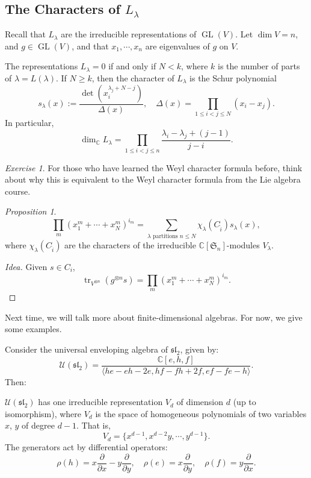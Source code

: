 \documentclass[a4paper]{report}
\theoremstyle{definition}
\theoremstyle{remark}
\theoremstyle{proposition}
\newtheorem{proposition}{Proposition}
\theoremstyle{conjecture}
\theoremstyle{lemma}
\theoremstyle{corollary}
\theoremstyle{exercise}
\newtheorem{exercise}{Exercise}
\theoremstyle{example}
\newcommand{\C}{\mathbb{C}}
\newcommand{\mcal}{\mathcal}
\newcommand{\on}{\operatorname}
\begin{document}
\subsection{The Characters of $L_\lambda$}

Recall that $L_\lambda$ are the irreducible representations of $\on{GL}(V)$.
Let $\dim V = n$, and $g \in \on{GL}(V)$, and that $x_1,\cdots,x_n$ are
eigenvalues of $g$ on $V$. 

\begin{theorem}
    The representations $L_\lambda = 0$ if and only if $N < k$, where 
    $k$ is the number of parts of $\lambda = L(\lambda)$. If $N \geq k$, then  
    the character of $L_\lambda$ is the Schur polynomial 
    $$s_\lambda(x) := \frac{\det (x_i^{\lambda_j + N - j})}{\Delta(x)},\quad \Delta(x) = \prod_{1\leq i<j\leq N}(x_i-x_j).$$
    In particular,
    $$\dim_\C L_\lambda = \prod_{1\leq i < j \leq n} \frac{\lambda_i - \lambda_j + (j-1)}{j-i}.$$
    \begin{exercise}
        For those who have learned the Weyl character formula before, think
        about why this is equivalent to the Weyl character formula from the 
        Lie algebra course.
    \end{exercise}
\end{theorem}

\begin{proposition}
    $$\prod_m (x_1^m + \cdots + x_N^m)^{i_m} = \sum_{\text{$\lambda$ partitions $n \leq N$}} \chi_\lambda(C_{\widehat{i}})s_\lambda(x),$$
    where $\chi_\lambda(C_{\widehat{i}})$ are the characters of 
    the irreducible $\C[\mathfrak{S}_n]$-modules $V_\lambda$.
\end{proposition}

\begin{proof}[Idea]
    Given $s \in C_i$, 
    $$\on{tr}_{V^{\otimes n}}(g^{\otimes n}s) = \prod_m (x_1^m + \cdots + x_N^m)^{i_m}.$$
\end{proof}

Next time, we will talk more about finite-dimensional algebras. For now, we 
give some examples.

Consider the universal enveloping algebra of $\mathfrak{sl}_2$,
given by: $$\mcal{U}(\mathfrak{sl}_2) = \frac{\C[e,h,f]}{\langle he-eh-2e, hf-fh+2f, ef-fe-h\rangle}.$$
Then:

\begin{theorem}
    $\mcal{U}(\mathfrak{sl}_2)$ has one irreducible representation $V_d$ 
    of dimension $d$ (up to isomorphism), where $V_d$ is the space of 
    homogeneous polynomials of two variables $x$, $y$ of degree $d-1$.
    That is, 
    $$V_d = \lbrace x^{d-1}, x^{d-2}y,\cdots, y^{d-1}\rbrace.$$
    The generators act by differential operators:
    $$\rho(h) = x\frac{\partial}{\partial x} - y\frac{\partial}{\partial y},\quad \rho(e) = x\frac{\partial}{\partial y},\quad \rho(f) = y\frac{\partial}{\partial x}.$$
\end{theorem}
\end{document}
